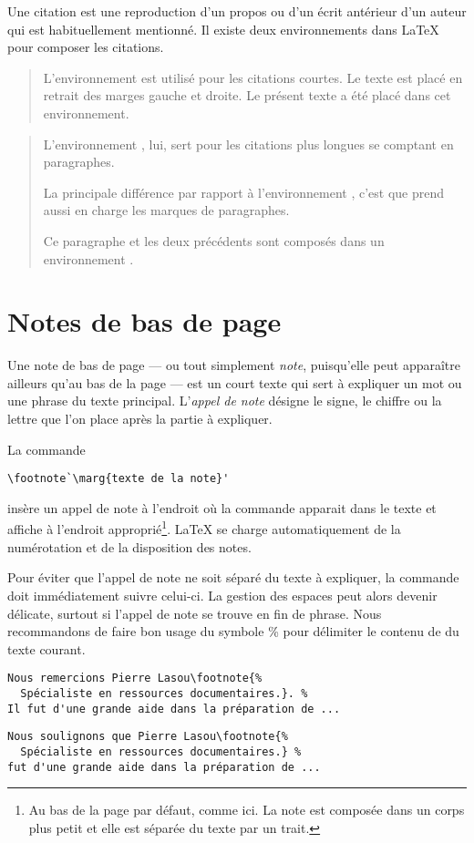 Une citation est une reproduction d'un propos ou d'un écrit antérieur
d'un auteur qui est habituellement mentionné. Il existe deux
environnements dans {\LaTeX} pour composer les citations.

\begin{quote}
  L'environnement  est utilisé pour les citations courtes.
  Le texte est placé en retrait des marges gauche et droite. Le
  présent texte a été placé dans cet environnement.
\end{quote}

\begin{quotation}
  L'environnement , lui, sert pour les citations plus
  longues se comptant en paragraphes.

  La principale différence par rapport à l'environnement ,
  c'est que  prend aussi en charge les marques de
  paragraphes.

  Ce paragraphe et les deux précédents sont composés dans
  un environnement .
\end{quotation}


\section{Notes de bas de page}
\label{sec:apparence:notes}

Une note de bas de page --- ou tout simplement \emph{note},
puisqu'elle peut apparaître ailleurs qu'au bas de la page --- est un
court texte qui sert à expliquer un mot ou une phrase du texte
principal. L'\emph{appel de note} désigne le signe, le chiffre ou la
lettre que l'on place après la partie à expliquer.

La commande
\begin{lstlisting}
\footnote`\marg{texte de la note}'
\end{lstlisting}
insère un appel de note à l'endroit où la commande apparait dans le
texte et affiche  à l'endroit
approprié\footnote{%
  Au bas de la page par défaut, comme ici. La note est composée dans
  un corps plus petit et elle est séparée du texte par un trait.}. %
{\LaTeX} se charge automatiquement de la numérotation et de la
disposition des notes.

Pour éviter que l'appel de note ne soit séparé du texte à expliquer,
la commande \cmd{\footnote} doit immédiatement suivre celui-ci. La
gestion des espaces peut alors devenir délicate, surtout si l'appel de
note se trouve en fin de phrase. Nous recommandons de faire bon usage
du symbole \% pour délimiter le contenu de \cmdprint{\footnote} du
texte courant.
\begin{lstlisting}[emph=footnote]
%% note en fin de phrase
Nous remercions Pierre Lasou\footnote{%
  Spécialiste en ressources documentaires.}. %
Il fut d'une grande aide dans la préparation de ...
\end{lstlisting}
\begin{lstlisting}[emph=footnote]
%% note au fil de la phrase
Nous soulignons que Pierre Lasou\footnote{%
  Spécialiste en ressources documentaires.} %
fut d'une grande aide dans la préparation de ...
\end{lstlisting}

